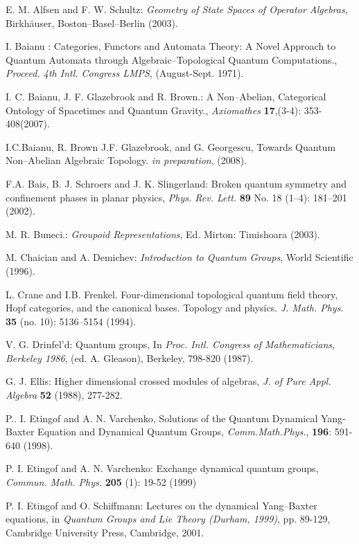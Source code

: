 \documentclass[12pt]{article}
\theoremstyle{plain}
\theoremstyle{definition}
\numberwithin{equation}{section}
\begin{document}
\begin{thebibliography}{9}

E. M. Alfsen and F. W. Schultz: \emph{Geometry of State Spaces of Operator Algebras}, Birkh\"auser, Boston--Basel--Berlin (2003).

I. Baianu : Categories, Functors and Automata Theory: A Novel Approach to Quantum Automata through Algebraic--Topological Quantum Computations., \textit{Proceed. 4th Intl. Congress LMPS}, (August-Sept. 1971).

I. C. Baianu, J. F. Glazebrook and R. Brown.: A Non--Abelian, Categorical Ontology of Spacetimes and Quantum Gravity., \emph{Axiomathes} \textbf{17},(3-4): 353-408(2007).

I.C.Baianu, R. Brown J.F. Glazebrook, and G. Georgescu, Towards Quantum Non--Abelian Algebraic Topology. \textit{in preparation}, (2008).

F.A. Bais, B. J. Schroers and J. K. Slingerland: Broken quantum symmetry and confinement phases in planar physics, \emph{Phys. Rev. Lett.} \textbf{89} No. 18 (1--4): 181--201 (2002).

M. R. Buneci.: \emph{Groupoid Representations}, Ed. Mirton: Timishoara (2003). 

M. Chaician and A. Demichev: \emph{Introduction to Quantum Groups}, World Scientific (1996).

L. Crane and I.B. Frenkel. Four-dimensional topological quantum field theory, Hopf categories, and the canonical bases. Topology and physics. \textit{J. Math. Phys}. \textbf{35} (no. 10): 5136--5154 (1994).

V. G. Drinfel'd: Quantum groups, In \emph{Proc. Intl. Congress of
Mathematicians, Berkeley 1986}, (ed. A. Gleason), Berkeley, 798-820 (1987).

G. J. Ellis: Higher dimensional crossed modules of algebras,
\emph{J. of Pure Appl. Algebra} \textbf{52} (1988), 277-282.

P.. I. Etingof and A. N. Varchenko, Solutions of the Quantum Dynamical Yang-Baxter Equation and Dynamical Quantum Groups, \emph{Comm.Math.Phys.}, \textbf{196}: 591-640 (1998).

P. I. Etingof and A. N. Varchenko: Exchange dynamical quantum groups, \emph{Commun. Math. Phys.} \textbf{205} (1): 19-52 (1999)

P. I. Etingof and O. Schiffmann: Lectures on the dynamical Yang--Baxter equations, in \emph{Quantum Groups and Lie Theory (Durham, 1999)}, pp. 89-129, Cambridge University Press, Cambridge, 2001.


\end{thebibliography}
\end{document}
